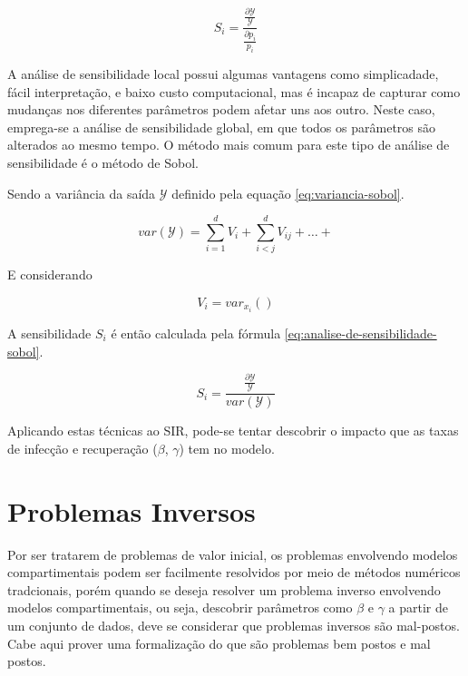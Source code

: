\begin{equation}\label{eq:analise-de-sensibilidade-local}
    S_i = \frac{\frac{\partial \mathcal{Y}}{\mathcal{Y}}}{\frac{\partial p_i}{p_i}}
\end{equation}

A análise de sensibilidade local possui algumas vantagens como simplicadade, 
fácil interpretação, e baixo custo computacional, mas é incapaz de capturar como 
mudanças nos diferentes parâmetros podem afetar uns aos outro. 
Neste caso, emprega-se a análise de sensibilidade global, em que todos os 
parâmetros são alterados ao mesmo tempo. 
O método mais comum para este tipo de análise de sensibilidade é o método 
de Sobol.

Sendo a variância da saída $\mathcal{Y}$ definido pela equação \ref{eq:variancia-sobol}.

\begin{equation}\label{eq:variancia-sobol}
    var(\mathcal{Y}) = \sum_{i=1}^{d}V_i + \sum_{i<j}^{d} V_{ij} + \dots +  
\end{equation}

E considerando 

\begin{equation}
    V_i = var_{x_i}()
\end{equation}

A sensibilidade $S_i$ é então calculada pela fórmula 
\ref{eq:analise-de-sensibilidade-sobol}. 

\begin{equation}\label{eq:analise-de-sensibilidade-sobol}
    S_i = \frac{\frac{\partial \mathcal{Y}}{\mathcal{Y}}}{var(\mathcal{Y})}
\end{equation}

Aplicando estas técnicas ao SIR, pode-se tentar descobrir o impacto que as taxas
de infecção e recuperação ($\beta$, $\gamma$) tem no modelo.

\section{Problemas Inversos}

Por ser tratarem de problemas de valor inicial, os problemas envolvendo modelos 
compartimentais podem ser facilmente resolvidos por meio de métodos numéricos 
tradcionais, porém quando se deseja resolver um problema inverso envolvendo modelos
compartimentais, ou seja, descobrir parâmetros como $\beta$ e $\gamma$ a partir
de um conjunto de dados, deve se considerar que problemas inversos são mal-postos.
Cabe aqui prover uma formalização do que são problemas bem postos e mal postos.

